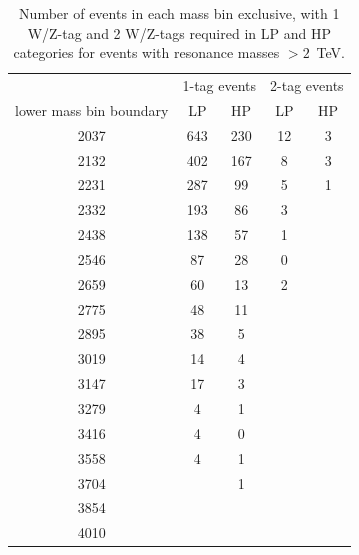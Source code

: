 \begin{table}[htb]
\begin{center}
\begin{tabular}{ccccc}
\hline
& \multicolumn{2}{c}{1-tag events} & \multicolumn{2}{c}{2-tag events} \\
lower mass bin boundary& LP & HP & LP & HP \\

\hline
2037 & 643 & 230 & 12 & 3 \\ 
2132 & 402 & 167 & 8 & 3 \\ 
2231 & 287 & 99 & 5 & 1 \\ 
2332 & 193 & 86 & 3 &  \\ 
2438 & 138 & 57 & 1 &  \\ 
2546 & 87 & 28 & 0 &  \\ 
2659 & 60 & 13 & 2 &  \\ 
2775 & 48 & 11 &  &  \\ 
2895 & 38 & 5 &  &  \\ 
3019 & 14 & 4 &  &  \\ 
3147 & 17 & 3 &  &  \\ 
3279 & 4 & 1 &  &  \\ 
3416 & 4 & 0 &  &  \\ 
3558 & 4 & 1 &  &  \\ 
3704 &  & 1 &  &  \\ 
3854 &  &  &  &  \\ 
4010 &  &  &  &  \\ 
\hline
\end{tabular}
\end{center}
\caption{Number of events in each mass bin exclusive, with 1 W/Z-tag and  2 W/Z-tags required in 
LP and HP categories for events with resonance masses $>2$~TeV.}
\label{table:eventnumbers}
\end{table}



\newpage




